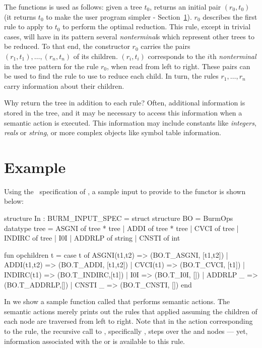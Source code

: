 The functions  is used as follows: given a tree $t_0$,
 returns an initial pair $(r_0, t_0)$ (it returns $t_0$ to
make the user program simpler - Section\ \ref{s:example}).
$r_0$
describes the first rule to apply to $t_0$ to perform the optimal
reduction.  This rule, except in trivial cases, will have in its
pattern several {\sl nonterminal}s which represent other trees to be
reduced.  To that end, the constructor $r_0$ carries the pairs 
\mbox{$(r_1,t_1), \ldots, (r_n,t_n)$} of its children.
$(r_i,t_i)$ corresponds to the $i$th {\sl nonterminal} in the tree pattern
for the rule $r_0$, when read from left to right.  These pairs can be used
to find the rule to use to reduce each child. In turn, the rules $r_1,
\ldots, r_n$ carry information about their children.

Why return the tree in addition to each rule?  Often, additional
information is stored in the tree, and it may be necessary to access this
information when a semantic action is executed. This information may
include constants like {\em integers}, {\em reals} or {\em string}, or more
complex objects like symbol table information.


		\section{Example}
		\label{s:example}

Using the \mlburg\ specification of , a sample
input to provide to the functor  is shown below:
\begin{code}
      structure In : BURM_INPUT_SPEC = struct
	structure BO = BurmOps
	datatype tree = 
	      ASGNI  of tree * tree
	    | ADDI   of tree * tree
	    | CVCI   of tree
	    | INDIRC of tree
	    | I0I
	    | ADDRLP of string
	    | CNSTI  of int

	fun opchildren t =
	  case t of
	    ASGNI(t1,t2)  => (BO.T_ASGNI, [t1,t2])
	  | ADDI(t1,t2)   => (BO.T_ADDI,  [t1,t2])
	  | CVCI(t1)      => (BO.T_CVCI,  [t1])
	  | INDIRC(t1)    => (BO.T_INDIRC,[t1])
	  | I0I           => (BO.T_I0I,   [])
	  | ADDRLP _      => (BO.T_ADDRLP,[])
	  | CNSTI _       => (BO.T_CNSTI, [])
      end
\end{code}




In  we show a sample function called  that
performs semantic actions. The semantic actions merely prints out the
rules that applied assuming the children of each node are traversed
from left to right. Note that in the action corresponding to the
 rule, the recursive call to ,
specifically , steps over the  and 
nodes --- yet, information associated with the  or
 is available to this rule.



